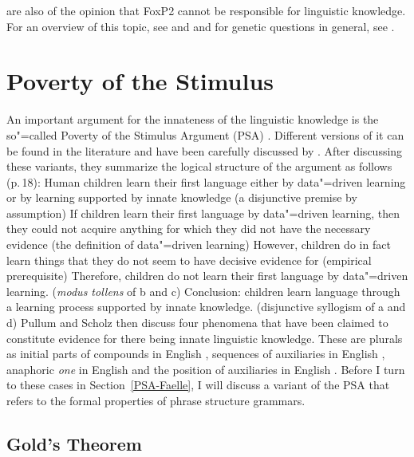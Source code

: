 \citet*[]{FHC2005a} are also of the opinion that FoxP2 cannot be responsible for linguistic knowledge. For an overview of this topic,
see  and  and for genetic questions in general, see . 

\section{Poverty of the Stimulus}
\label{Abschnitt-PSA}


An important argument for the innateness of the linguistic knowledge is the so"=called
Poverty of the Stimulus Argument (PSA) \citep[]{Chomsky80b-u}. Different versions of it can be found in the literature and have been carefully discussed
by \citet{PS2002a}. After discussing these variants, they summarize the logical structure of the
argument as follows (p.\,18):
\eal
\ex Human children learn their first language either by data"=driven learning or by learning supported by innate knowledge (a disjunctive premise by assumption)
\ex If children learn their first language by data"=driven learning, then they could not acquire anything for which they did not have the necessary evidence
(the definition of data"=driven learning)
\ex However, children do in fact learn things that they do not seem to have decisive evidence for (empirical prerequisite)
\ex Therefore, children do not learn their first language by data"=driven learning. (\emph{modus tollens} of b and c)
\ex Conclusion: children learn language through a learning process supported by innate knowledge. (disjunctive syllogism of a and d)
\zl
Pullum and Scholz then discuss four phenomena that have been claimed to constitute evidence for there being innate linguistic knowledge.
These are plurals as initial parts of compounds in English \citep{Gordon86a}, sequences of auxiliaries in English
\citep{Kimball73b-u}, anaphoric \emph{one} in English \citep{Baker78a-u} and the position of auxiliaries in English \citep[--33]{Chomsky71a-u}.
Before I turn to these cases in Section~\ref{PSA-Faelle}, I will discuss a variant of the PSA that refers to the formal properties of
phrase structure grammars.

\subsection{Gold's Theorem}
\label{Abschnitt-Golds-Theorem}

